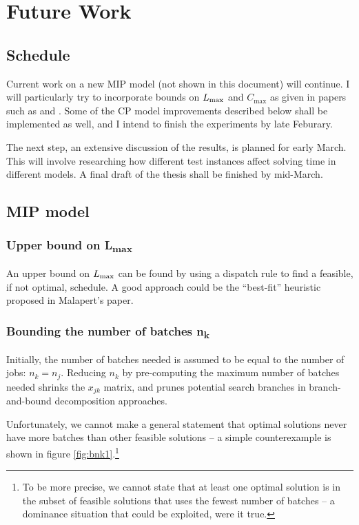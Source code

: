 \chapter{Future Work}\label{sec:futurework}
\section{Schedule}
Current work on a new MIP model (not shown in this document) will continue. I
will particularly try to incorporate bounds on $\Lmax$ and $C_\text{max}$ as
given in papers such as \citep{Azizoglu} and \citep{Dupont}. Some of the CP
model improvements described below shall be implemented as well, and I intend to
finish the experiments by late Feburary.

The next step, an extensive discussion of the results, is planned for early
March. This will involve researching how different test instances affect solving
time in different models. A final draft of the thesis shall be finished by
mid-March.

\section{MIP model}
\subsection[Upper bound on $\Lmax$]{Upper bound on {\sansitalicfont L}\textsubscript{max}}
An upper bound on $\Lmax$ can be found by using a dispatch rule to find a
feasible, if not optimal, schedule. A good approach could be the ``best-fit''
heuristic proposed in Malapert's paper. 

\subsection[Bounding the number of batches $n_k$]{Bounding the number of batches
\sansitalicfont n\textsubscript{k}}\label{sec:bounding_nk}
Initially, the number of batches needed is assumed to be equal to the number of
jobs: $n_k = n_j$. Reducing $n_k$ by pre-computing the maximum number of batches
needed shrinks the $x_{jk}$ matrix, and prunes potential search branches in
branch-and-bound decomposition approaches.


Unfortunately, we cannot make a general statement that optimal solutions never
have more batches than other feasible solutions -- a simple counterexample is
shown in figure \ref{fig:bnk1}.\footnote{To be more precise, we cannot state
that at least one optimal solution is in the subset of feasible solutions that
uses the fewest number of batches -- a dominance situation that could be
exploited, were it true.}

